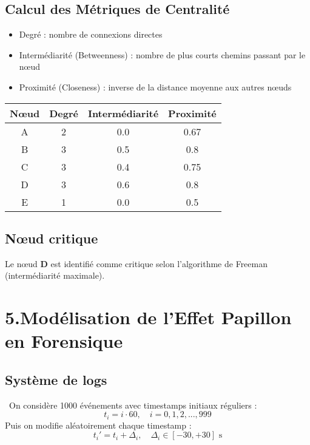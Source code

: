 \documentclass[12pt,a4paper]{report}
\begin{document}
{\begin{center}
		\end{center}
		
		\subsection*{Calcul des Métriques de Centralité}
		\begin{itemize}
			\item Degré : nombre de connexions directes
			\item Intermédiarité (Betweenness) : nombre de plus courts chemins passant par le nœud
			\item Proximité (Closeness) : inverse de la distance moyenne aux autres nœuds
		\end{itemize}
		
		\begin{center}
			\begin{tabular}{c|c|c|c}
				Nœud & Degré & Intermédiarité & Proximité \\
				\hline
				A & 2 & 0.0 & 0.67 \\
				B & 3 & 0.5 & 0.8 \\
				C & 3 & 0.4 & 0.75 \\
				D & 3 & 0.6 & 0.8 \\
				E & 1 & 0.0 & 0.5 \\
			\end{tabular}
		\end{center}
		
		\subsection*{Nœud critique}
		Le nœud \textbf{D} est identifié comme critique selon l’algorithme de Freeman (intermédiarité maximale).
		
		\section*{5.Modélisation de l’Effet Papillon en Forensique}
		
		\subsection*{Système de logs}\
		On considère 1000 événements avec timestamps initiaux réguliers :
		\[
		t_i = i \cdot 60, \quad i = 0,1,2,...,999
		\]
		Puis on modifie aléatoirement chaque timestamp :
		\[
		t_i' = t_i + \Delta_i, \quad \Delta_i \in [-30, +30]\text{ s}
		\]
		
}
\end{document}
